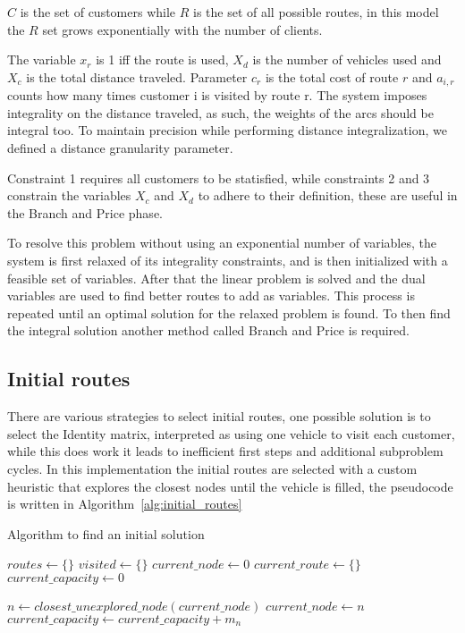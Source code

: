 $C$ is the set of customers while $R$ is the set of all possible routes, in this model the $R$ set grows exponentially with the number of clients.

The variable $x_r$ is 1 iff the route is used, $X_d$ is the number of vehicles used and $X_c$ is the total distance traveled. Parameter $c_r$ is the total cost of route $r$ and $a_{i, r}$ counts how many times customer i is visited by route r. The system imposes integrality on the distance traveled, as such, the weights of the arcs should be integral too. To maintain precision while performing distance integralization, we defined a distance granularity parameter.

Constraint 1 requires all customers to be statisfied, while constraints 2 and 3 constrain the variables $X_c$ and $X_d$ to adhere to their definition, these are useful in the Branch and Price phase.

To resolve this problem without using an exponential number of variables, the system is first relaxed of its integrality constraints, and is then initialized with a feasible set of variables. After that the linear problem is solved and the dual variables are used to find better routes to add as variables. This process is repeated until an optimal solution for the relaxed problem is found. To then find the integral solution another method called Branch and Price is required.

\subsection{Initial routes}
There are various strategies to select initial routes, one possible solution is to select the Identity matrix, interpreted as using one vehicle to visit each customer, while this does work it leads to inefficient first steps and additional subproblem cycles.
In this implementation the initial routes are selected with a custom heuristic that explores the closest nodes until the vehicle is filled, the pseudocode is written in Algorithm~\ref{alg:initial_routes}
\begin{algorithm}[htb]
  \caption{Algorithm to find an initial solution}\label{alg:initial_routes}
  \begin{algorithmic}
    \State $routes \gets \{\}$
    \State $visited \gets \{\}$
    \State $current\_node \gets 0$
    \State $current\_route \gets \{\}$
    \State $current\_capacity \gets 0$

      \State $n \gets closest\_unexplored\_node(current\_node)$
      \EndIf
      \State $current\_node \gets n$
      \State $current\_capacity \gets current\_capacity + m_n $
    \EndWhile

  \end{algorithmic}
\end{algorithm}


